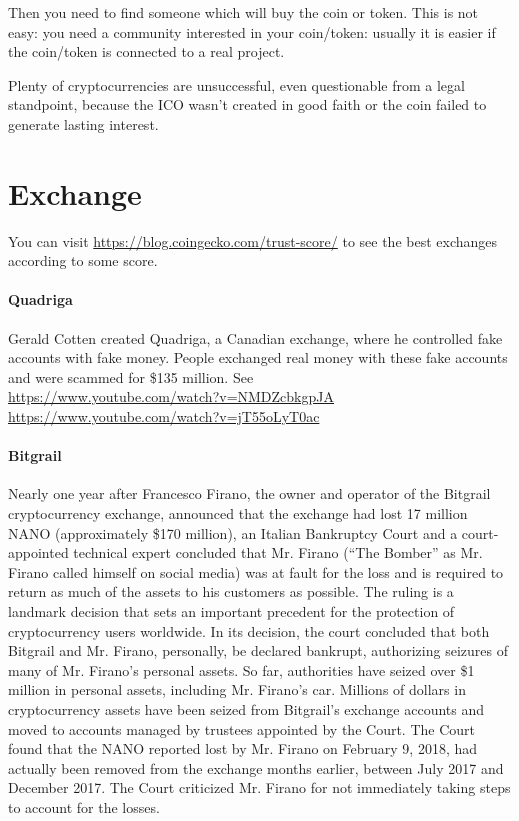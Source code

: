 Then you need to find someone which will buy the coin or token. This is not easy: you need a community interested in your coin/token: usually it is easier if the coin/token is connected to a real project.

Plenty of cryptocurrencies are unsuccessful, even questionable from a legal standpoint, because the ICO wasn't created in good faith or the coin failed to generate lasting interest.

\section{Exchange}

You can visit \url{https://blog.coingecko.com/trust-score/} to see the best exchanges according to some score.

\paragraph{Quadriga} Gerald Cotten created Quadriga, a Canadian exchange, where he controlled fake accounts with fake money. People exchanged real money with these fake accounts and were scammed for \$135 million. See\\
\url{https://www.youtube.com/watch?v=NMDZcbkgpJA}\\
\url{https://www.youtube.com/watch?v=jT55oLyT0ac}

\paragraph{Bitgrail} Nearly one year after Francesco Firano, the owner and operator of the Bitgrail cryptocurrency exchange, announced that the exchange had lost 17 million NANO (approximately \$170 million), an Italian Bankruptcy Court and a court-appointed technical expert concluded that Mr. Firano (``The Bomber'' as Mr. Firano called himself on social media) was at fault for the loss and is required to return as much of the assets to his customers as possible. The ruling is a landmark decision that sets an important precedent for the protection of cryptocurrency users worldwide. In its decision, the court concluded that both Bitgrail and Mr. Firano, personally, be declared bankrupt, authorizing seizures of many of Mr. Firano’s personal assets. So far, authorities have seized over \$1 million in personal assets, including Mr. Firano’s car. Millions of dollars in cryptocurrency assets have been seized from Bitgrail’s exchange accounts and moved to accounts managed by trustees appointed by the Court. The Court found that the NANO reported lost by Mr. Firano on February 9, 2018, had actually been removed from the exchange months earlier, between July 2017 and December 2017. The Court criticized Mr. Firano for not immediately taking steps to account for the losses.


